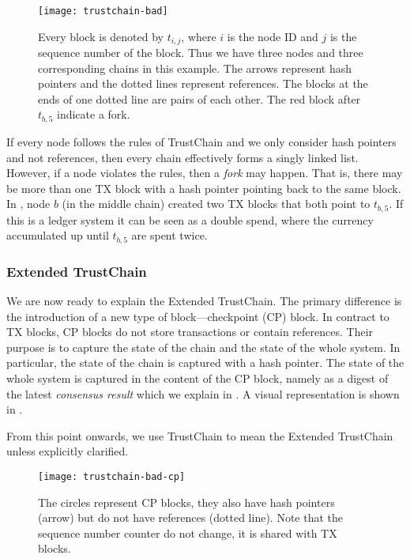 \begin{figure}
    \texttt{[image: trustchain-bad]}
    \centering
    \caption{Every block is denoted by $t_{i,j}$, where $i$ is the node ID and $j$ is the sequence number of the block.
    Thus we have three nodes and three corresponding chains in this example.
    The arrows represent hash pointers and the dotted lines represent references.
    The blocks at the ends of one dotted line are pairs of each other.
    The red block after $t_{b, 5}$ indicate a fork.}
    \label{fig:trustchain-bad}
\end{figure}

If every node follows the rules of TrustChain and we only consider hash pointers and not references,
then every chain effectively forms a singly linked list.
However, if a node violates the rules, then a \emph{fork} may happen.
That is, there may be more than one TX block with a hash pointer pointing back to the same block.
In , node $b$ (in the middle chain) created two TX blocks that both point to $t_{b, 5}$.
If this is a ledger system it can be seen as a double spend, where the currency accumulated up until $t_{b, 5}$ are spent twice.

\subsubsection*{Extended TrustChain}
We are now ready to explain the Extended TrustChain.
The primary difference is the introduction of a new type of block---checkpoint (CP) block.
In contract to TX blocks, CP blocks do not store transactions or contain references.
Their purpose is to capture the state of the chain and the state of the whole system.
In particular, the state of the chain is captured with a hash pointer.
The state of the whole system is captured in the content of the CP block,
namely as a digest of the latest \emph{consensus result} which we explain in .
A visual representation is shown in .

From this point onwards, we use TrustChain to mean the Extended TrustChain unless explicitly clarified.

\begin{figure}
    \texttt{[image: trustchain-bad-cp]}
    \centering
    \caption{The circles represent CP blocks,
    they also have hash pointers (arrow) but do not have references (dotted line).
    Note that the sequence number counter do not change, it is shared with TX blocks.}
    \label{fig:trustchain-bad-cp}
\end{figure}


